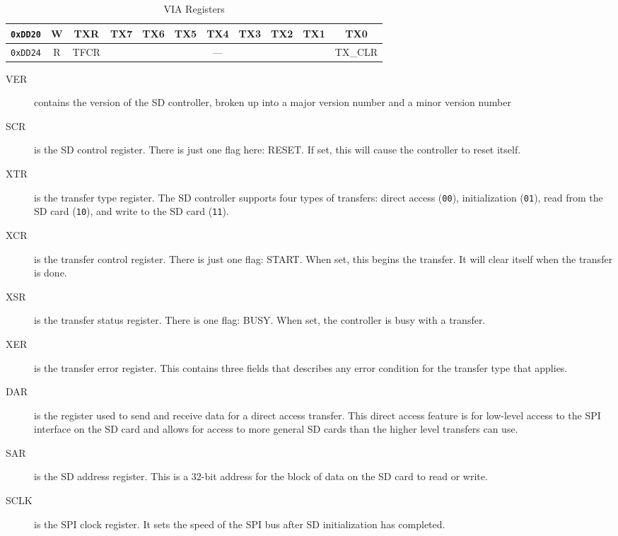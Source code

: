 \begin{table}[h]
\begin{center}
\begin{tabular}{|c|c|c|c|c|c|c|c|c|c|c|}
            \verb+0xDD20+ & W & TXR & TX7 & TX6 & TX5 & TX4 & TX3 & TX2 & TX1 & TX0 \\ \hline
            \verb+0xDD24+ & R & TFCR & \multicolumn{7}{|c|}{---} & TX\_CLR \\ \hline
        \end{tabular}

    \end{center}
    \caption{VIA Registers}
    \label{tab:sdc_reg}
\end{table}

\begin{description}
    \item[VER] contains the version of the SD controller, broken up into a major version number and a minor version number

    \item[SCR] is the SD control register. There is just one flag here: RESET. If set, this will cause the controller to reset itself.

    \item[XTR] is the transfer type register. The SD controller supports four types of transfers: direct access (\verb+00+), initialization (\verb+01+), read from the SD card (\verb+10+), and write to the SD card (\verb+11+).

    \item[XCR] is the transfer control register. There is just one flag: START. When set, this begins the transfer. It will clear itself when the transfer is done.

    \item[XSR] is the transfer status register. There is one flag: BUSY. When set, the controller is busy with a transfer.

    \item[XER] is the transfer error register. This contains three fields that describes any error condition for the transfer type that applies.

    \item[DAR] is the register used to send and receive data for a direct access transfer. This direct access feature is for low-level access to the SPI interface on the SD card and allows for access to more general SD cards than the higher level transfers can use.

    \item[SAR] is the SD address register. This is a 32-bit address for the block of data on the SD card to read or write.

    \item[SCLK] is the SPI clock register. It sets the speed of the SPI bus after SD initialization has completed.


\end{description}
